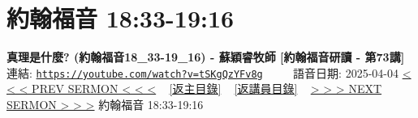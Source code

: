 \documentclass{book}
\begin{document}
\section{約翰福音 18:33-19:16}
\label{sec:tSKgQzYFv8g}
\textbf{真理是什麼? (約翰福音18\_33-19\_16) - 蘇穎睿牧師 [約翰福音研讀 - 第73講]}
\newline
\newline
連結: \href{https://youtube.com/watch?v=tSKgQzYFv8g}{\texttt{https://youtube.com/watch?v=tSKgQzYFv8g}} ~~~~ 語音日期: 2025-04-04
\newline
\newline
\hyperref[sec:Ujp9LOC7dII]{< < < PREV SERMON < < <}
~
\hyperlink{toc}{[返主目錄]}
~
\hyperref[ch:preacher11]{[返講員目錄]}
~
\hyperref[sec:OtTM_EdQEtA]{> > > NEXT SERMON > > >}
\newline
\newline
約翰福音 18:33-19:16
\newline
\end{document}
